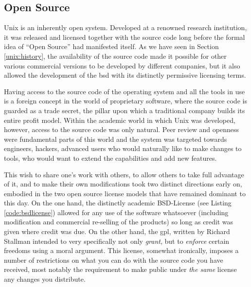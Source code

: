 \subsection{Open Source}
\label{unix:open-source}

Unix is an inherently open system.  Developed at a
renowned research institution, it was released and
licensed together with the source code long before the
formal idea of ``Open Source'' had
manifested itself.  As we have seen in Section
\ref{unix:history}, the availability of the source
code made it possible for other various commercial
versions to be developed by different companies, but
it also allowed the development of the \gls{bsd} with
its distinctly permissive licensing terms.

Having access to the source code of the operating
system and all the tools in use is a foreign concept
in the world of proprietary software, where the source
code is guarded as a trade secret, the pillar upon
which a traditional company builds its entire profit
model.  Within the academic world in which Unix was
developed, however, access to the source code was only
natural.  Peer review and openness were fundamental
parts of this world and the system was targeted
towards engineers, hackers, advanced users who would
naturally like to make changes to tools, who would
want to extend the capabilities and add new features.

This wish to share one's work with others, to allow
others to take full advantage of it, and to make their
own modifications took two distinct directions early
on, embodied in the two open source license models
that have remained dominant to this day.  On the one
hand, the distinctly academic
BSD-License (see Listing
\ref{code:bsdlicense}) allowed for any use of the
software whatsoever (including modification and
commercial re-selling of the products) so long as
credit was given where credit was due.  On the other
hand, the \gls{gpl}, written by Richard
Stallman intended to
very specifically not only {\em grant}, but to {\em
enforce} certain freedoms using a moral argument.
This license, somewhat ironically, imposes a number of
restrictions on what you can do with the source code
you have received, most notably the requirement to
make public under {\em the same} license any changes
you distribute.

